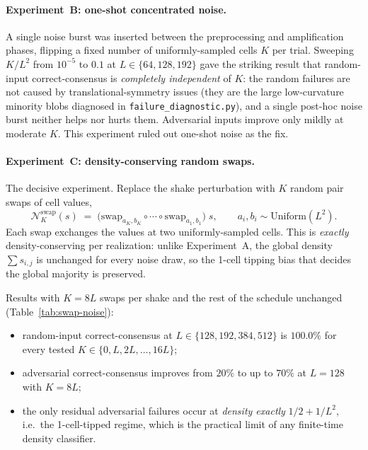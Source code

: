 \documentclass[11pt,a4paper]{article}
\begin{document}
\paragraph{Experiment~B: one-shot concentrated noise.}
A single noise burst was inserted between the preprocessing and amplification
phases, flipping a fixed number of uniformly-sampled cells \(K\) per trial.
Sweeping \(K/L^2\) from \(10^{-5}\) to \(0.1\) at \(L\in\{64,128,192\}\) gave
the striking result that random-input correct-consensus is
\emph{completely independent} of \(K\): the random failures are not caused by
translational-symmetry issues (they are the large low-curvature minority
blobs diagnosed in \texttt{failure\_diagnostic.py}), and a single post-hoc
noise burst neither helps nor hurts them.  Adversarial inputs improve only
mildly at moderate \(K\).  This experiment ruled out one-shot noise as the
fix.

\paragraph{Experiment~C: density-conserving random swaps.}
The decisive experiment.  Replace the shake perturbation with \(K\) random
pair swaps of cell values,
\[
\mathcal{N}_K^{\mathrm{swap}}(s)\;=\;\bigl(\mathrm{swap}_{a_K,b_K}\circ\cdots\circ
\mathrm{swap}_{a_1,b_1}\bigr)\;s,
\qquad a_i, b_i \sim \mathrm{Uniform}(L^2).
\]
Each swap exchanges the values at two uniformly-sampled cells.  This is
\emph{exactly} density-conserving per realization: unlike Experiment~A, the
global density \(\sum s_{i,j}\) is unchanged for every noise draw, so the
1-cell tipping bias that decides the global majority is preserved.

Results with \(K=8L\) swaps per shake and the rest of the schedule
unchanged (Table~\ref{tab:swap-noise}):
\begin{itemize}
\item random-input correct-consensus at \(L\in\{128,192,384,512\}\) is
\(100.0\%\) for every tested \(K \in\{0,L,2L,\dots,16L\}\);
\item adversarial correct-consensus improves from \(20\%\) to up to \(70\%\)
at \(L=128\) with \(K=8L\);
\item the only residual adversarial failures occur at \emph{density exactly}
\(1/2+1/L^2\), i.e.\ the 1-cell-tipped regime, which is the practical limit
of any finite-time density classifier.
\end{itemize}
\end{document}
